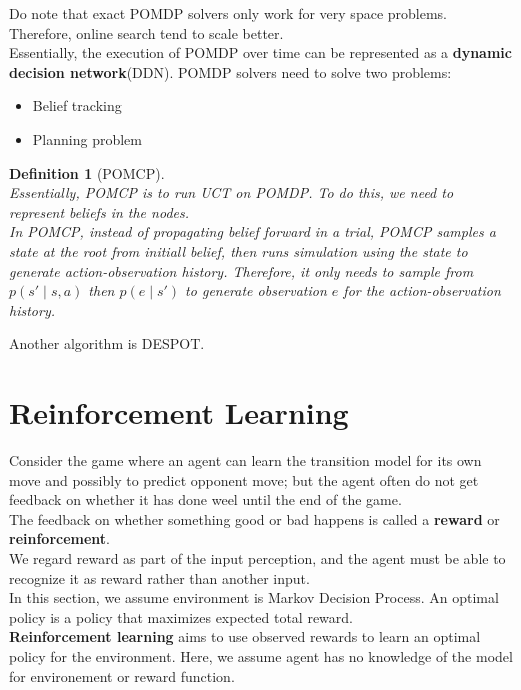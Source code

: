 \documentclass[12pt]{article}
\newtheorem{definition}{Definition}[section]
\theoremstyle{definition}
\begin{document}
Do note that exact POMDP solvers only work for very space problems. Therefore, online search tend to scale better.\\
Essentially, the execution of POMDP over time can be represented as a \textbf{dynamic decision network}(DDN). POMDP solvers need to solve two problems:
\begin{itemize}
\item Belief tracking
\item Planning problem
\end{itemize}
\begin{definition}[POMCP]
\hfill\\\normalfont Essentially, POMCP is to run UCT on POMDP. To do this, we need to represent beliefs in the nodes.\\
In POMCP, instead of propagating belief forward in a trial, POMCP samples a state at the root from initiall belief, then runs simulation using the state to generate action-observation history. Therefore, it only needs to sample from $p(s'\mid s,a)$ then $p(e\mid s')$ to generate observation $e$ for the action-observation history.
\end{definition}
Another algorithm is DESPOT.
\clearpage
\section{Reinforcement Learning}
Consider the game where an agent can learn the transition model for its own move and possibly to predict opponent move; but the agent often do not get feedback on whether it has done weel until the end of the game.\\
The feedback on whether something good or bad happens is called a \textbf{reward} or \textbf{reinforcement}.\\
We regard reward as part of the input perception, and the agent must be able to recognize it as reward rather than another input.\\
In this section, we assume environment is Markov Decision Process. An optimal policy is a policy that maximizes expected total reward.\\
\textbf{Reinforcement learning} aims to use observed rewards to learn an optimal policy for the environment. Here, we assume agent has no knowledge of the model for environement or reward function.
\end{document}
